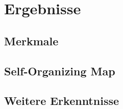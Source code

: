\section{Ergebnisse}

\subsection{Merkmale}
\lipsum[1-8]

\subsection{Self-Organizing Map}
\lipsum[1-8]

\subsection{Weitere Erkenntnisse}
\lipsum[1-4]